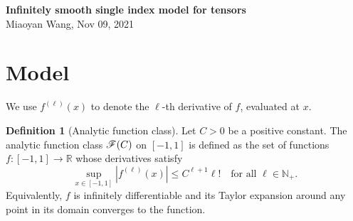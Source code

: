 \documentclass[11pt]{article}
\theoremstyle{plain}
\theoremstyle{definition}
\newtheorem{defn}{Definition}
\def\calif{\large\mathscr{F}}
\begin{document}
\begin{center}
{\bf \Large Infinitely smooth single index model for tensors}\\
Miaoyan Wang, Nov 09, 2021\\
\end{center}


\section{Model}
We use $f^{(\ell)}(x)$ to denote the $\ell$-th derivative of $f$, evaluated at $x$. 
\begin{defn}[Analytic function class] Let $C>0$ be a positive constant. The analytic function class $\calif(C)$ on $[-1,1]$ is defined as the set of functions $f\colon [-1,1]\to \mathbb{R}$ whose derivatives satisfy
\[
\sup_{x\in[-1,1]}|f^{(\ell)}(x)|\leq C^{\ell+1}\ell! \quad \text{for all }\ell\in\mathbb{N}_{+}.
\]
Equivalently, $f$ is infinitely differentiable and its Taylor expansion around any point in its domain converges to the function. 
\end{defn}

\end{document}
